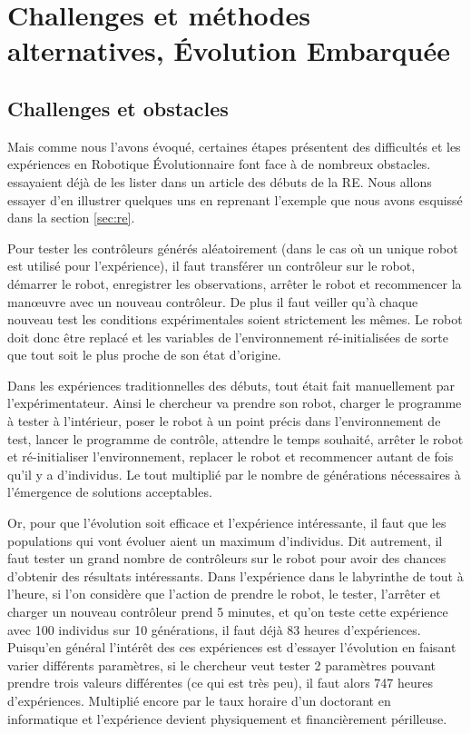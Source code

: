 \section{Challenges et méthodes alternatives, \'Evolution Embarquée}\label{sec:RE:EE}
\subsection{Challenges et obstacles}\label{sec:RE:EE:obs}
Mais comme nous l'avons évoqué, certaines étapes présentent des difficultés et les expériences en Robotique \'Evolutionnaire font face à de nombreux obstacles. \cite{mataric96challengesinevolvingcontrollersforphysicalrobots} essayaient déjà de les lister dans un article des débuts de la RE. Nous allons essayer d'en illustrer quelques uns en reprenant l'exemple que nous avons esquissé dans la section \ref{sec:re}.

Pour tester les contrôleurs générés aléatoirement (dans le cas où un unique robot est utilisé pour l'expérience), il faut  transférer un contrôleur sur le robot, démarrer le robot, enregistrer les observations, arrêter le robot et recommencer la manœuvre avec un nouveau contrôleur. De plus il faut veiller qu'à chaque nouveau test les conditions expérimentales soient strictement les mêmes. Le robot doit donc être replacé et les variables de l'environnement ré-initialisées de sorte que tout soit le plus proche de son état d'origine.

Dans les expériences traditionnelles des débuts, tout était fait manuellement par l'expérimentateur. Ainsi le chercheur va prendre son robot, charger le programme à tester à l'intérieur, poser le robot à un point précis dans l'environnement de test, lancer le programme de contrôle, attendre le temps souhaité, arrêter le robot et ré-initialiser l'environnement, replacer le robot et recommencer autant de fois qu'il y a d'individus. Le tout multiplié par le nombre de générations nécessaires à l'émergence de solutions acceptables.

Or, pour que l'évolution soit efficace et l'expérience intéressante, il faut que les populations qui vont évoluer aient un maximum d'individus. Dit autrement, il faut tester un grand nombre de contrôleurs sur le robot pour avoir des chances d'obtenir des résultats intéressants. Dans l'expérience dans le labyrinthe de tout à l'heure, si l'on considère que l'action de prendre le robot, le tester, l'arrêter et charger un nouveau contrôleur prend 5 minutes, et qu'on teste cette expérience avec 100 individus sur 10 générations, il faut déjà 83 heures d'expériences. Puisqu'en général l'intérêt des ces expériences est d'essayer l'évolution en faisant varier différents paramètres, si le chercheur veut tester 2 paramètres pouvant prendre trois valeurs différentes (ce qui est très peu), il faut alors 747 heures d'expériences. Multiplié encore par le taux horaire d'un doctorant en informatique et l'expérience devient physiquement et financièrement périlleuse.

